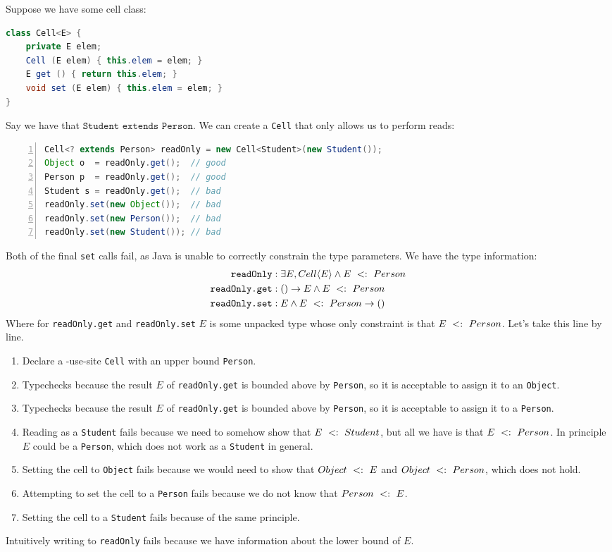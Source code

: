 \documentclass{article}
\begin{document}
\begin{example}
Suppose we have some cell class:
\begin{lstlisting}[language=Java]
class Cell<E> {
    private E elem;
    Cell (E elem) { this.elem = elem; }
    E get () { return this.elem; }
    void set (E elem) { this.elem = elem; }
}
\end{lstlisting}
Say we have that $\texttt{Student extends Person}$.
We can create a \covar{} \texttt{Cell} that only allows us to perform reads:
\begin{lstlisting}[language=Java, numbers=left]
Cell<? extends Person> readOnly = new Cell<Student>(new Student());
Object o  = readOnly.get();  // good
Person p  = readOnly.get();  // good
Student s = readOnly.get();  // bad
readOnly.set(new Object());  // bad
readOnly.set(new Person());  // bad
readOnly.set(new Student()); // bad
\end{lstlisting}
Both of the final \texttt{set} calls fail, as Java is unable to correctly constrain the type parameters.
We have the type information:
\begin{align*}
\texttt{readOnly} &: \exists E, Cell \langle E \rangle \wedge E ~ <: ~ Person \\
\texttt{readOnly.get} &: () \rightarrow E \wedge E ~ <: ~ Person \\
\texttt{readOnly.set} &: E \wedge E ~ <: ~ Person \rightarrow ()
\end{align*}
Where for \texttt{readOnly.get} and \texttt{readOnly.set} $E$ is some unpacked type whose only constraint is that $E ~ <: ~ Person$.
Let's take this line by line.
\begin{enumerate}
\item Declare a \covar{}-use-site \texttt{Cell} with an upper bound \texttt{Person}.
\item Typechecks because the result $E$ of \texttt{readOnly.get} is bounded above by \texttt{Person}, so it is acceptable to assign it to an \texttt{Object}.
\item  Typechecks because the result $E$ of \texttt{readOnly.get} is bounded above by \texttt{Person}, so it is acceptable to assign it to a \texttt{Person}.
\item Reading as a \texttt{Student} fails because we need to somehow show that $E ~ <: ~ Student$, but all we have is that $E ~ <: ~ Person$. In principle $E$ could be a \texttt{Person}, which does not work as a \texttt{Student} in general.
\item Setting the cell to \texttt{Object} fails because we would need to show that $Object ~ <: ~ E$ and $Object ~ <: ~ Person$, which does not hold.
\item Attempting to set the cell to a \texttt{Person} fails because we do not know that $Person ~ <: ~ E$.
\item Setting the cell to a \texttt{Student} fails because of the same principle.
\end{enumerate}
Intuitively writing to \texttt{readOnly} fails because we have information about the lower bound of $E$.


\end{example}
\end{document}
